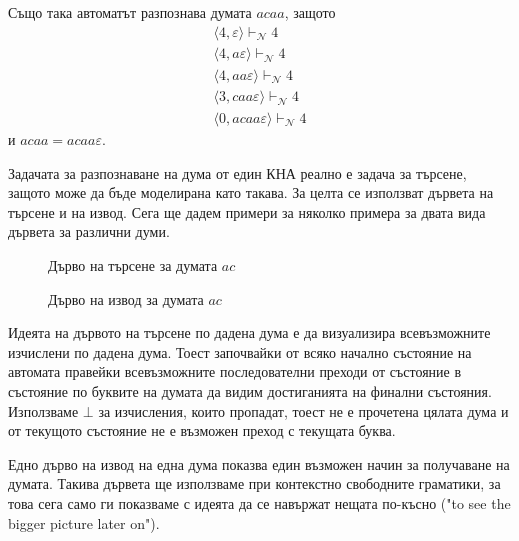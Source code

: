 \documentclass[12pt]{article}
\begin{document}
Също така автоматът разпознава думата \(acaa\), защото
\begin{align*}
    \langle 4, \varepsilon  \rangle \vdash_\mathcal{N} 4 \\
    \langle 4, a\varepsilon  \rangle \vdash_\mathcal{N} 4 \\
    \langle 4, aa\varepsilon  \rangle \vdash_\mathcal{N} 4 \\
    \langle 3, caa\varepsilon  \rangle \vdash_\mathcal{N} 4 \\
    \langle 0, acaa\varepsilon  \rangle \vdash_\mathcal{N} 4
\end{align*}
и \(acaa = acaa\varepsilon\). \\\par

Задачата за разпознаване на дума от един КНА реално е задача за търсене, защото може да бъде моделирана като такава.
За целта се използват дървета на търсене и на извод. Сега ще дадем примери за няколко примера за двата вида дървета за различни думи.

\begin{figure}[H]
\centering
{}
\caption{Дърво на търсене за думата $ac$}
\end{figure}


\begin{figure}[H]
\centering
{}
\caption{Дърво на извод за думата $ac$}
\end{figure}

Идеята на дървото на търсене по дадена дума е да визуализира всевъзможните изчислени по дадена дума.
Тоест започвайки от всяко начално състояние на автомата правейки всевъзможните последователни преходи от състояние в състояние по буквите на думата да видим достиганията на финални състояния. Използваме \(\bot\) за изчисления, които пропадат, тоест не е прочетена цялата дума и от текущото състояние не е възможен преход с текущата буква. \\\par
Едно дърво на извод на една дума показва един възможен начин за получаване на думата.
Такива дървета ще използваме при контекстно свободните граматики, за това сега само ги показваме с идеята да се навържат нещата по-късно ("to see the bigger picture later on").
\end{document}
